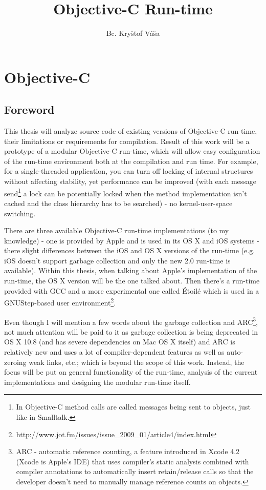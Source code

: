 \documentclass[a4paper, 11pt, fleqn]{book}
\begin{document}
\title{Objective-C Run-time}
\author{Bc. Kry\u{s}tof V\'{a}\u{s}a}
\date{}
\maketitle

\chapter{Objective-C}
\section{Foreword}

This thesis will analyze source code of existing versions of Objective-C run-time, their limitations or requirements for compilation. Result of this work will be a prototype of a modular Objective-C run-time, which will allow easy configuration of the run-time environment both at the compilation and run time. For example, for a single-threaded application, you can turn off locking of internal structures without affecting stability, yet performance can be improved (with each message send\footnote{In Objective-C method calls are called messages being sent to objects, just like in Smalltalk.} a lock can be potentially locked when the method implementation isn't cached and the class hierarchy has to be searched) - no kernel-user-space switching.

There are three available Objective-C run-time implementations (to my knowledge) - one is provided by Apple and is used in its OS X and iOS systems - there slight differences between the iOS and OS X versions of the run-time (e.g. iOS doesn't support garbage collection and only the new 2.0 run-time is available). Within this thesis, when talking about Apple's implementation of the run-time, the OS X version will be the one talked about. Then there's a run-time provided with GCC and a more experimental one called \'{E}toil\'{e} which is used in a GNUStep-based user environment\footnote{http://www.jot.fm/issues/issue\_2009\_01/article4/index.html}.

Even though I will mention a few words about the garbage collection and ARC\footnote{ARC - automatic reference counting, a feature introduced in Xcode 4.2 (Xcode is Apple's IDE) that uses compiler's static analysis combined with compiler annotations to automatically insert retain/release calls so that the developer doesn't need to manually manage reference counts on objects.}, not much attention will be paid to it as garbage collection is being deprecated in OS X 10.8 (and has severe dependencies on Mac OS X itself) and ARC is relatively new and uses a lot of compiler-dependent features as well as auto-zeroing weak links, etc.; which is beyond the scope of this work. Instead, the focus will be put on general functionality of the run-time, analysis of the current implementations and designing the modular run-time itself.
  
\end{document}
